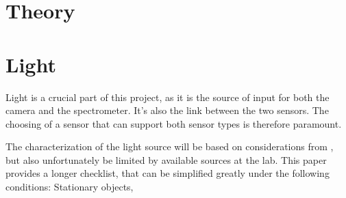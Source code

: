 \documentclass{article}
\begin{document}
\section{Theory}



\section{Light}
Light is a crucial part of this project, as it is the source of input for both the camera and the spectrometer. It's also the link between the two sensors. The choosing of a sensor that can support both sensor types is therefore paramount. 

The characterization of the light source will be based on considerations from \cite{martinPracticalGuideMachine}, but also unfortunately be limited by available sources at the lab. This paper provides a longer checklist, that can be simplified greatly under the following conditions: Stationary objects, 






\end{document}
